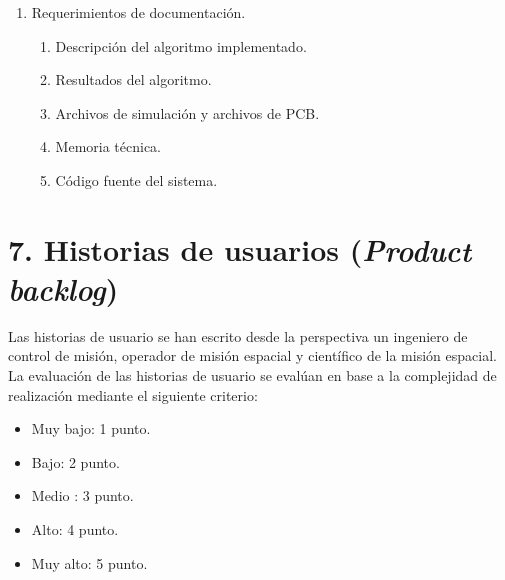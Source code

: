 \documentclass[
11pt, %
]{charter}
\begin{document}
\begin{enumerate}
\item Requerimientos de documentación.
	\begin{enumerate}
		\item Descripción del algoritmo implementado. 
		\item Resultados del algoritmo. 
		\item Archivos de simulación y archivos de PCB. 
		\item Memoria técnica.
		\item Código fuente del sistema. 
	\end{enumerate}
\end{enumerate}



\section{7. Historias de usuarios (\textit{Product backlog})}
\label{sec:backlog}
Las historias de usuario se han escrito desde la perspectiva un ingeniero de control de misión, operador de misión espacial y científico de la misión espacial. La evaluación de las historias de usuario se evalúan en base a la complejidad de realización mediante el siguiente criterio: 
\begin{itemize}
	\item Muy bajo: 1 punto. 
	\item Bajo: 2 punto. 
	\item Medio : 3 punto. 
	\item Alto: 4 punto. 
	\item Muy alto: 5 punto. 
\end{itemize}
\end{document}
